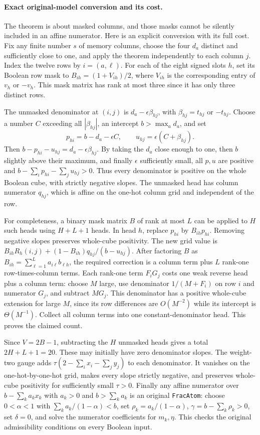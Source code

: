 \documentclass[11pt]{article}
\begin{document}
\paragraph{Exact original-model conversion and its cost.}
The theorem is about masked columns, and those masks cannot be
silently included in an affine numerator. Here is an explicit
conversion with its full cost. Fix any finite number $s$ of memory
columns, choose the four $d_a$ distinct and sufficiently close to
one, and apply the theorem independently to each column $j$.
Index the twelve rows by $i=(a,\ell)$. For each of the eight signed
slots $h$, set its Boolean row mask to $B_{ih}=(1+V_{ih})/2$, where
$V_{ih}$ is the corresponding entry of $v_h$ or $-v_h$. This mask
matrix has rank at most three since it has only three distinct rows.

The unmasked denominator at $(i,j)$ is $d_a-\epsilon\beta_{hj}$,
with $\beta_{hj}=t_{hj}$ or $-t_{hj}$. Choose a number $C$ exceeding
all $|\beta_{hj}|$, an intercept $b>\max_a d_a$, and set
\[
 p_{hi}=b-d_a-\epsilon C,\qquad
 u_{hj}=\epsilon(C+\beta_{hj}).
 \tag{8}
\]
Then $b-p_{hi}-u_{hj}=d_a-\epsilon\beta_{hj}$. By taking the $d_a$
close enough to one, then $b$ slightly above their maximum, and
finally $\epsilon$ sufficiently small, all $p,u$ are positive and
$b-\sum_i p_{hi}-\sum_j u_{hj}>0$. Thus every denominator is
positive on the whole Boolean cube, with strictly negative slopes.
The unmasked head has column numerator $q_{hj}$, which is affine on
the one-hot column grid and independent of the row.

For completeness, a binary mask matrix $B$ of rank at most $L$ can
be applied to $H$ such heads using $H+L+1$ heads. In head $h$, replace
$p_{hi}$ by $B_{ih}p_{hi}$. Removing negative slopes preserves
whole-cube positivity. The new grid value is
$B_{ih}R_h(i,j)+(1-B_{ih})q_{hj}/(b-u_{hj})$. After factoring $B$ as
$B_{ih}=\sum_{\ell=1}^L a_{i\ell}b_{\ell h}$, the required correction
is a column term plus $L$ rank-one row-times-column terms.
Each rank-one term $F_iG_j$ costs one weak reverse head plus a column
term: choose $M$ large, use denominator $1/(M+F_i)$ on row $i$ and
numerator $G_j$, and subtract $MG_j$. This denominator has a positive
whole-cube extension for large $M$, since its row differences are
$O(M^{-2})$ while its intercept is $\Theta(M^{-1})$. Collect all
column terms into one constant-denominator head. This proves the
claimed count.

Since $V=2B-1$, subtracting the $H$ unmasked heads gives a total
$2H+L+1=20$. These may initially have zero denominator slopes. The
weight-two gauge adds $\tau(2-\sum_i x_i-\sum_j y_j)$ to each
denominator. It vanishes on the one-hot-by-one-hot grid, makes every
slope strictly negative, and preserves whole-cube positivity for
sufficiently small $\tau>0$. Finally any affine numerator over
$b-\sum_k a_kx_k$ with $a_k>0$ and $b>\sum_k a_k$ is an original
\texttt{FracAtom}: choose $0<\alpha<1$ with
$\sum_k a_k/(1-\alpha)<b$, set $\rho_k=a_k/(1-\alpha)$,
$\gamma=b-\sum_k\rho_k>0$, set $\delta=0$, and solve the numerator
coefficients for $m_k,\eta$. This checks the original admissibility
conditions on every Boolean input.
\end{document}
